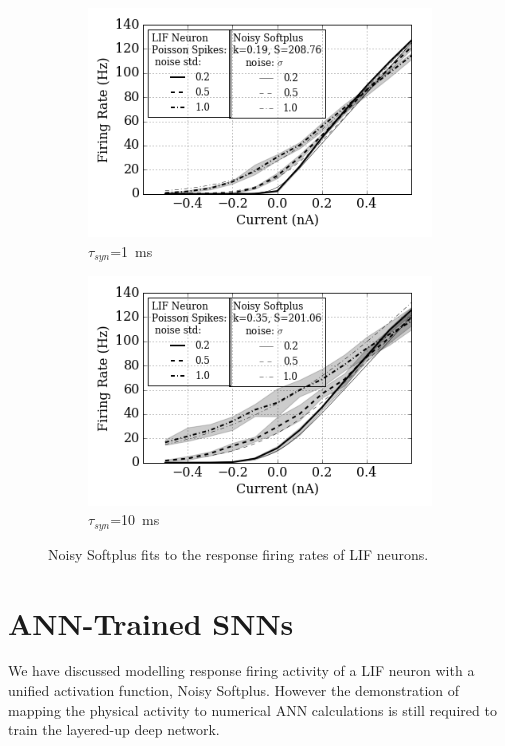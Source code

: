 	\begin{figure}
		\centering
		\begin{subfigure}[t]{0.49\textwidth}
			\includegraphics[width=\textwidth]{pics_iconip/4-1.png}
			\caption{$\tau_{syn}$=1~ms}
		\end{subfigure}
		\begin{subfigure}[t]{0.49\textwidth}
			\includegraphics[width=\textwidth]{pics_iconip/4-10.png}
			\caption{$\tau_{syn}$=10~ms}
		\end{subfigure}
		\caption{Noisy Softplus fits to the response firing rates of LIF neurons.}
		\label{Fig:nsptau1}
	\end{figure}		
	
	
\section{ANN-Trained SNNs}	
	We have discussed modelling response firing activity of a LIF neuron with a unified activation function, Noisy Softplus.
	However the demonstration of mapping the physical activity to numerical ANN calculations is still required to train the layered-up deep network.
	
